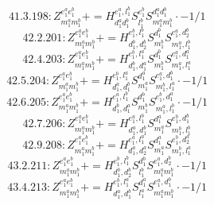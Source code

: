 \documentclass[letterpaper,10pt,fleqn,leqno,onecolumn]{article}
\begin{document}
\begin{equation} \;\;\;\;\;\;  41.3.198: Z^{e_{1}^{a}e_{1}^{b}}_{m_{1}^{a}m_{1}^{b}}+=H^{e_{1}^{a},l_{1}^{b}}_{d_{1}^{a}d_{1}^{b}}S^{e_{1}^{b}}_{l_{1}^{b}}S^{d_{1}^{a}d_{1}^{b}}_{m_{1}^{a}m_{1}^{b}}\cdot -1/1 \end{equation}
\begin{equation} \;\;\;\;\;\;  42.2.201: Z^{e_{1}^{a}e_{1}^{b}}_{m_{1}^{a}m_{1}^{b}}+=H^{e_{1}^{b},l_{1}^{b}}_{d_{1}^{b},d_{2}^{b}}S^{d_{1}^{b}}_{m_{1}^{b}}S^{e_{1}^{a},d_{2}^{b}}_{m_{1}^{a},l_{1}^{b}} \end{equation}
\begin{equation} \;\;\;\;\;\;  42.4.203: Z^{e_{1}^{a}e_{1}^{b}}_{m_{1}^{a}m_{1}^{b}}+=H^{e_{1}^{b},l_{1}^{a}}_{d_{1}^{b},d_{1}^{a}}S^{d_{1}^{b}}_{m_{1}^{b}}S^{e_{1}^{a},d_{1}^{a}}_{m_{1}^{a},l_{1}^{a}} \end{equation}
\begin{equation} \;\;\;\;\;\;  42.5.204: Z^{e_{1}^{a}e_{1}^{b}}_{m_{1}^{a}m_{1}^{b}}+=H^{e_{1}^{b},l_{1}^{a}}_{d_{1}^{a},d_{1}^{b}}S^{d_{1}^{a}}_{m_{1}^{a}}S^{e_{1}^{a},d_{1}^{b}}_{m_{1}^{b},l_{1}^{a}}\cdot -1/1 \end{equation}
\begin{equation} \;\;\;\;\;\;  42.6.205: Z^{e_{1}^{a}e_{1}^{b}}_{m_{1}^{a}m_{1}^{b}}+=H^{e_{1}^{a},l_{1}^{b}}_{d_{1}^{b},d_{1}^{a}}S^{d_{1}^{b}}_{m_{1}^{b}}S^{e_{1}^{b},d_{1}^{a}}_{m_{1}^{a},l_{1}^{b}}\cdot -1/1 \end{equation}
\begin{equation} \;\;\;\;\;\;  42.7.206: Z^{e_{1}^{a}e_{1}^{b}}_{m_{1}^{a}m_{1}^{b}}+=H^{e_{1}^{a},l_{1}^{b}}_{d_{1}^{a},d_{1}^{b}}S^{d_{1}^{a}}_{m_{1}^{a}}S^{e_{1}^{b},d_{1}^{b}}_{m_{1}^{b},l_{1}^{b}} \end{equation}
\begin{equation} \;\;\;\;\;\;  42.9.208: Z^{e_{1}^{a}e_{1}^{b}}_{m_{1}^{a}m_{1}^{b}}+=H^{e_{1}^{a},l_{1}^{a}}_{d_{1}^{a},d_{2}^{a}}S^{d_{1}^{a}}_{m_{1}^{a}}S^{e_{1}^{b},d_{2}^{a}}_{m_{1}^{b},l_{1}^{a}} \end{equation}
\begin{equation} \;\;\;\;\;\;  43.2.211: Z^{e_{1}^{a}e_{1}^{b}}_{m_{1}^{a}m_{1}^{b}}+=H^{e_{1}^{b},l_{1}^{b}}_{d_{1}^{b},d_{2}^{b}}S^{d_{1}^{b}}_{l_{1}^{b}}S^{e_{1}^{a},d_{2}^{b}}_{m_{1}^{a}m_{1}^{b}}\cdot -1/1 \end{equation}
\begin{equation} \;\;\;\;\;\;  43.4.213: Z^{e_{1}^{a}e_{1}^{b}}_{m_{1}^{a}m_{1}^{b}}+=H^{e_{1}^{b},l_{1}^{a}}_{d_{1}^{a},d_{1}^{b}}S^{d_{1}^{a}}_{l_{1}^{a}}S^{e_{1}^{a},d_{1}^{b}}_{m_{1}^{a}m_{1}^{b}}\cdot -1/1 \end{equation}
\end{document}
